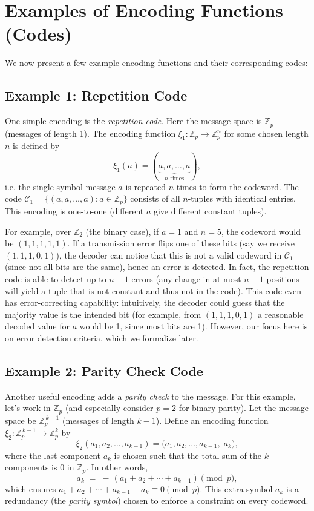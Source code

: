 \documentclass[docmute]{article}
\begin{document}
\section{Examples of Encoding Functions (Codes)}

We now present a few example encoding functions and their corresponding codes:

\subsection*{Example 1: Repetition Code}
One simple encoding is the \emph{repetition code}. Here the message space is $\mathbb{Z}_p$ (messages of length 1). The encoding function $\xi_1: \mathbb{Z}_p \to \mathbb{Z}_p^n$ for some chosen length $n$ is defined by 
\[ \xi_1(a) = (\underbrace{a, a, \ldots, a}_{n \text{ times}}), \] 
i.e. the single-symbol message $a$ is repeated $n$ times to form the codeword. The code $\mathcal{C}_1 = \{(a,a,\ldots,a) : a \in \mathbb{Z}_p\}$ consists of all $n$-tuples with identical entries. This encoding is one-to-one (different $a$ give different constant tuples).

\medskip

For example, over $\mathbb{Z}_2$ (the binary case), if $a=1$ and $n=5$, the codeword would be $(1,1,1,1,1)$. If a transmission error flips one of these bits (say we receive $(1,1,1,0,1)$), the decoder can notice that this is not a valid codeword in $\mathcal{C}_1$ (since not all bits are the same), hence an error is detected. In fact, the repetition code is able to detect up to $n-1$ errors (any change in at most $n-1$ positions will yield a tuple that is not constant and thus not in the code). This code even has error-correcting capability: intuitively, the decoder could guess that the majority value is the intended bit (for example, from $(1,1,1,0,1)$ a reasonable decoded value for $a$ would be 1, since most bits are 1). However, our focus here is on error detection criteria, which we formalize later.

\subsection*{Example 2: Parity Check Code}
Another useful encoding adds a \emph{parity check} to the message. For this example, let's work in $\mathbb{Z}_p$ (and especially consider $p=2$ for binary parity). Let the message space be $\mathbb{Z}_p^{\,k-1}$ (messages of length $k-1$). Define an encoding function $\xi_2: \mathbb{Z}_p^{\,k-1} \to \mathbb{Z}_p^k$ by 
\[ \xi_2(a_1, a_2, \ldots, a_{k-1}) = \big(a_1, a_2, \ldots, a_{k-1}, \; a_k\big), \] 
where the last component $a_k$ is chosen such that the total sum of the $k$ components is 0 in $\mathbb{Z}_p$. In other words,
\[ a_k \;=\; -\,(a_1 + a_2 + \cdots + a_{k-1}) \pmod{p}, \] 
which ensures $a_1 + a_2 + \cdots + a_{k-1} + a_k \equiv 0 \pmod{p}$. This extra symbol $a_k$ is a redundancy (the \emph{parity symbol}) chosen to enforce a constraint on every codeword.
\end{document}
